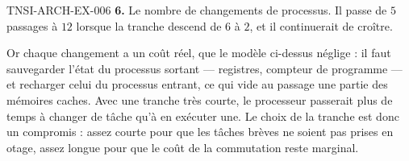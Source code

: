 \begin{corrige}{TNSI-ARCH-EX-006}
\textbf{6.} Le nombre de changements de processus. Il passe de $5$ passages à
$12$ lorsque la tranche descend de $6$ à $2$, et il continuerait de croître.

Or chaque changement a un coût réel, que le modèle ci-dessus néglige : il faut
sauvegarder l'état du processus sortant — registres, compteur de programme — et
recharger celui du processus entrant, ce qui vide au passage une partie des
mémoires caches. Avec une tranche très courte, le processeur passerait plus de
temps à changer de tâche qu'à en exécuter une. Le choix de la tranche est donc
un compromis : assez courte pour que les tâches brèves ne soient pas prises en
otage, assez longue pour que le coût de la commutation reste marginal.
\end{corrige}
